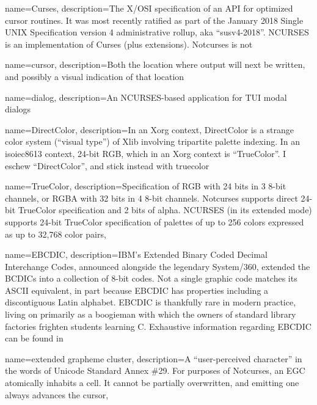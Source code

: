 {
  name={Curses},
description={The X/OSI specification of an API for optimized cursor routines. It
  was most recently ratified as part of the January 2018 Single UNIX
  Specification version 4 administrative rollup, aka ``susv4-2018''. NCURSES is
  an implementation of Curses (plus extensions). Notcurses is not}
}

{
  name={cursor},
description={Both the location where output will next be written, and possibly
  a visual indication of that location}
}

{
  name={dialog},
description={An NCURSES-based application for TUI modal dialogs}
}

{
  name={DirectColor},
  description={In an Xorg context, DirectColor is a strange color system
    (``visual type'') of Xlib\cite{xvisualtypes} involving tripartite palette
    indexing. In an \Gls{isoiec8613} context, 24-bit RGB, which in an Xorg
    context is ``TrueColor''. I eschew ``DirectColor'', and stick instead with
    \Gls{truecolor}}
}

{
  name={TrueColor},
  description={Specification of RGB with 24 bits in 3 8-bit channels, or RGBA
    with 32 bits in 4 8-bit channels\cite{X11displays}. Notcurses supports
    direct 24-bit TrueColor specification and 2 bits of alpha. NCURSES (in its
    extended mode) supports 24-bit TrueColor specification of palettes of up to
    256 colors expressed as up to 32,768 color pairs},
}

{
  name={EBCDIC},
  description={IBM's Extended Binary Coded Decimal Interchange Codes, announced
    alongside the legendary System/360, extended the BCDICs into a collection
    of 8-bit codes. Not a single graphic code matches its ASCII equivalent, in
    part because EBCDIC has properties including a discontiguous Latin
    alphabet. EBCDIC is thankfully rare in modern practice, living on primarily
    as a boogieman with which the owners of standard library factories frighten
    students learning C. Exhaustive information regarding EBCDIC can be found
    in \cite{codedcharactersets}}
}

{
  name={extended grapheme cluster},
description={A ``user-perceived character'' in the words of Unicode Standard Annex
  \#29\cite{annex29}. For purposes of Notcurses, an EGC atomically inhabits a
  cell. It cannot be partially overwritten, and emitting one always advances
  the cursor},
}

